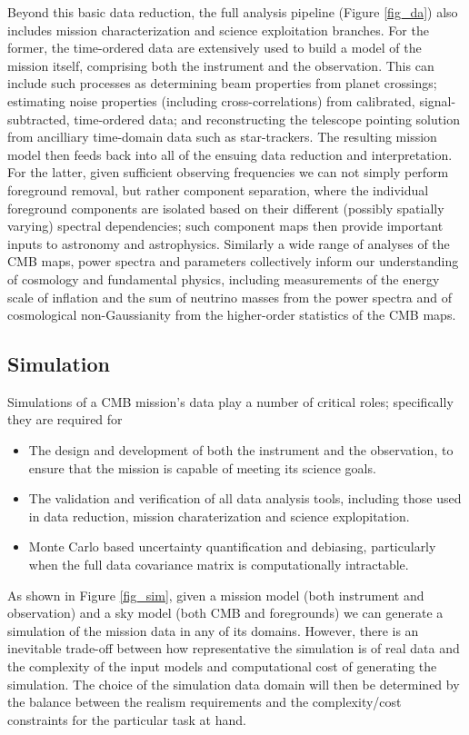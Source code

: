 Beyond this basic data reduction, the full analysis pipeline (Figure \ref{fig_da}) also includes mission characterization and science exploitation branches. For the former, the time-ordered data are extensively used to build a model of the mission itself, comprising both the instrument and the observation. This can include such processes as determining beam properties from planet crossings; estimating noise properties (including cross-correlations) from calibrated, signal-subtracted, time-ordered data; and reconstructing the telescope pointing solution from ancilliary time-domain data such as star-trackers. The resulting mission model then feeds back into all of the ensuing data reduction and interpretation. For the latter, given sufficient observing frequencies we can not simply perform foreground removal, but rather component separation, where the individual foreground components are isolated based on their different (possibly spatially varying) spectral dependencies; such component maps then provide important inputs to astronomy and astrophysics. Similarly a wide range of analyses of the CMB maps, power spectra and parameters collectively inform our understanding of cosmology and fundamental physics, including measurements of the energy scale of inflation and the sum of neutrino masses from the power spectra and of cosmological non-Gaussianity from the higher-order statistics of the CMB maps.

\subsection{Simulation}
Simulations of a CMB mission's data play a number of critical roles; specifically they are required for
\begin{itemize}
\item The design and development of both the instrument and the observation, to ensure that the mission is capable of meeting its science goals.
\item The validation and verification of all data analysis tools, including those used in data reduction, mission charaterization and science explopitation.
\item Monte Carlo based uncertainty quantification and debiasing, particularly when the full data covariance matrix is computationally intractable.
\end{itemize}

As shown in Figure \ref{fig_sim}, given a mission model (both instrument and observation) and a sky model (both CMB and foregrounds) we can generate a simulation of the mission data in any of its domains. However, there is an inevitable trade-off between how representative the simulation is of real data and the complexity of the input models and computational cost of generating the simulation. The choice of the simulation data domain will then be determined by the balance between the realism requirements and the complexity/cost constraints for the particular task at hand.

